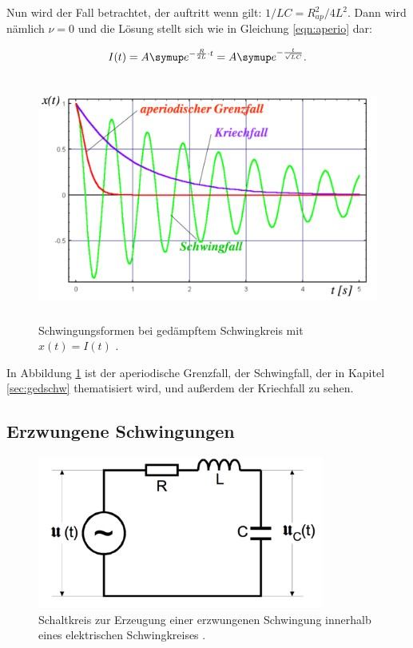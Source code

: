 Nun wird der Fall betrachtet, der auftritt wenn gilt:
$1/LC = R_{ap}^2/4L^2$. Dann wird nämlich $\nu = 0$ und die Lösung stellt
sich wie in Gleichung \eqref{eqn:aperio} dar:

\begin{equation}
  I(t) = A \g{e}^{-\frac{R}{2L}\cdot t} = A \g{e}^{-\frac{t}{\sqrt{LC}}}.
  \label{eqn:aperio}
\end{equation}

\begin{figure}[h]
  \centering
  \includegraphics[height = 8cm]{aperio.pdf}
  \caption{Schwingungsformen bei gedämpftem Schwingkreis mit $x(t) = I(t)$ \cite{weis}.}
  \label{fig:aperio}
\end{figure}

In Abbildung \ref{fig:aperio} ist der aperiodische Grenzfall, der
Schwingfall, der in Kapitel \ref{sec:gedschw} thematisiert wird, und
außerdem der Kriechfall zu sehen.

\subsection{Erzwungene Schwingungen}

\begin{figure}[h]
  \centering
  \includegraphics[height = 5cm]{erzwschw.pdf}
  \caption{Schaltkreis zur Erzeugung einer erzwungenen Schwingung innerhalb
  eines elektrischen Schwingkreises \cite{anleitung}.}
  \label{fig:erzwschw}
\end{figure}

